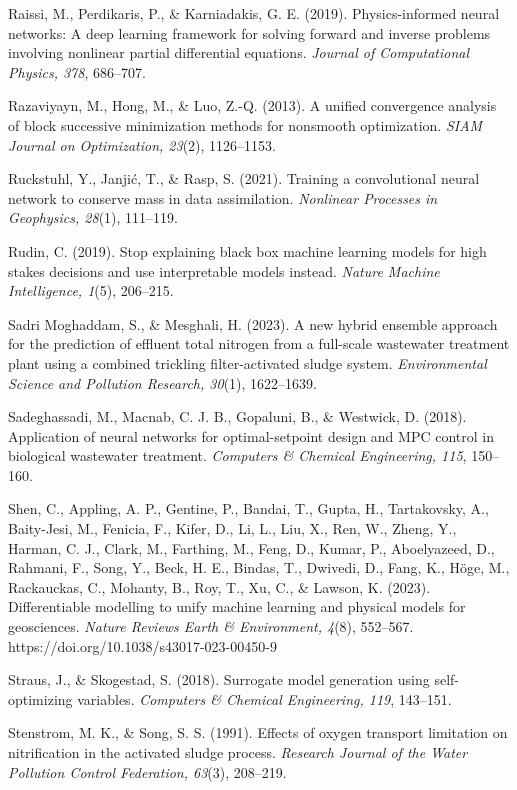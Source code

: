 \documentclass[a4paper,fleqn]{cas-sc}
\begin{document}
\noindent Raissi, M., Perdikaris, P., \& Karniadakis, G. E. (2019). Physics-informed neural networks: A deep learning framework for solving forward and inverse problems involving nonlinear partial differential equations. \textit{Journal of Computational Physics, 378}, 686--707.

\noindent Razaviyayn, M., Hong, M., \& Luo, Z.-Q. (2013). A unified convergence analysis of block successive minimization methods for nonsmooth optimization. \textit{SIAM Journal on Optimization, 23}(2), 1126--1153.

\noindent Ruckstuhl, Y., Janji\'{c}, T., \& Rasp, S. (2021). Training a convolutional neural network to conserve mass in data assimilation. \textit{Nonlinear Processes in Geophysics, 28}(1), 111--119.

\noindent Rudin, C. (2019). Stop explaining black box machine learning models for high stakes decisions and use interpretable models instead. \textit{Nature Machine Intelligence, 1}(5), 206--215.

\noindent Sadri Moghaddam, S., \& Mesghali, H. (2023). A new hybrid ensemble approach for the prediction of effluent total nitrogen from a full-scale wastewater treatment plant using a combined trickling filter-activated sludge system. \textit{Environmental Science and Pollution Research, 30}(1), 1622--1639.

\noindent Sadeghassadi, M., Macnab, C. J. B., Gopaluni, B., \& Westwick, D. (2018). Application of neural networks for optimal-setpoint design and MPC control in biological wastewater treatment. \textit{Computers \& Chemical Engineering, 115}, 150--160.

\noindent Shen, C., Appling, A. P., Gentine, P., Bandai, T., Gupta, H., Tartakovsky, A., Baity-Jesi, M., Fenicia, F., Kifer, D., Li, L., Liu, X., Ren, W., Zheng, Y., Harman, C. J., Clark, M., Farthing, M., Feng, D., Kumar, P., Aboelyazeed, D., Rahmani, F., Song, Y., Beck, H. E., Bindas, T., Dwivedi, D., Fang, K., H\"oge, M., Rackauckas, C., Mohanty, B., Roy, T., Xu, C., \& Lawson, K. (2023). Differentiable modelling to unify machine learning and physical models for geosciences. \textit{Nature Reviews Earth \& Environment, 4}(8), 552--567. https://doi.org/10.1038/s43017-023-00450-9

\noindent Straus, J., \& Skogestad, S. (2018). Surrogate model generation using self-optimizing variables. \textit{Computers \& Chemical Engineering, 119}, 143--151.

\noindent Stenstrom, M. K., \& Song, S. S. (1991). Effects of oxygen transport limitation on nitrification in the activated sludge process. \textit{Research Journal of the Water Pollution Control Federation, 63}(3), 208--219.
\end{document}
